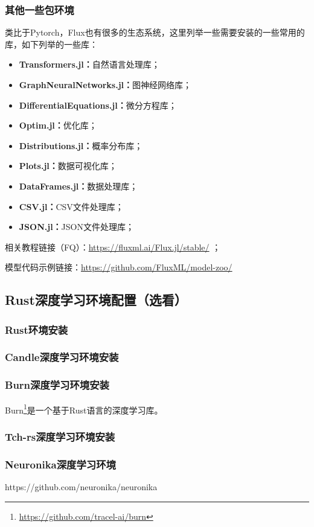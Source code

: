 \documentclass[lang=cn,a4paper,newtx]{elegantpaper}
\begin{document}
\subsubsection{其他一些包环境}
类比于Pytorch，Flux也有很多的生态系统，这里列举一些需要安装的一些常用的库，如下列举的一些库：
\begin{itemize}
  \item \textbf{Transformers.jl：}自然语言处理库；
  \item \textbf{GraphNeuralNetworks.jl：}图神经网络库；
  \item \textbf{DifferentialEquations.jl：}微分方程库；
  \item \textbf{Optim.jl：}优化库；
  \item \textbf{Distributions.jl：}概率分布库；
  \item \textbf{Plots.jl：}数据可视化库；
  \item \textbf{DataFrames.jl：}数据处理库；
  \item \textbf{CSV.jl：}CSV文件处理库；
  \item \textbf{JSON.jl：}JSON文件处理库；
\end{itemize}

相关教程链接（FQ）：\url{https://fluxml.ai/Flux.jl/stable/} ；

模型代码示例链接：\url{https://github.com/FluxML/model-zoo/}

\subsection{Rust深度学习环境配置（选看）}
\subsubsection{Rust环境安装}
\subsubsection{Candle深度学习环境安装}
\subsubsection{Burn深度学习环境安装}
Burn\footnote{\url{https://github.com/tracel-ai/burn}}是一个基于Rust语言的深度学习库。
\subsubsection{Tch-rs深度学习环境安装}
\subsubsection{Neuronika深度学习环境}
https://github.com/neuronika/neuronika
\end{document}
